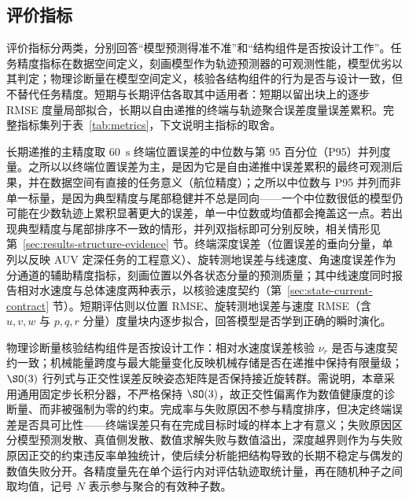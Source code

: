 \subsection{评价指标}
\label{subsec:metrics}

评价指标分两类，分别回答“模型预测得准不准”和“结构组件是否按设计工作”。任务精度指标在数据空间定义，刻画模型作为轨迹预测器的可观测性能，模型优劣以其判定；物理诊断量在模型空间定义，核验各结构组件的行为是否与设计一致，但不替代任务精度。短期与长期评估各取其中适用者：短期以留出块上的逐步 RMSE 度量局部拟合，长期以自由递推的终端与轨迹聚合误差度量误差累积。完整指标集列于表~\ref{tab:metrics}，下文说明主指标的取舍。

长期递推的主精度取 60~\(\mathrm{s}\) 终端位置误差的中位数与第 95 百分位（P95）并列度量。之所以以终端位置误差为主，是因为它是自由递推中误差累积的最终可观测后果，并在数据空间有直接的任务意义（航位精度）；之所以中位数与 P95 并列而非单一标量，是因为典型精度与尾部稳健并不总是同向——一个中位数很低的模型仍可能在少数轨迹上累积显著更大的误差，单一中位数或均值都会掩盖这一点。若出现典型精度与尾部排序不一致的情形，并列双指标即可分别反映，相关情形见第~\ref{sec:results-structure-evidence} 节。终端深度误差（位置误差的垂向分量，单列以反映 AUV 定深任务的工程意义）、旋转测地误差与线速度、角速度误差作为分通道的辅助精度指标，刻画位置以外各状态分量的预测质量；其中线速度同时报告相对水速度与总体速度两种表示，以核验速度契约（第~\ref{sec:state-current-contract} 节）。短期评估则以位置 RMSE、旋转测地误差与速度 RMSE（含 \(u,v,w\) 与 \(p,q,r\) 分量）度量块内逐步拟合，回答模型是否学到正确的瞬时演化。

物理诊断量核验结构组件是否按设计工作：相对水速度误差核验 \(\nu_r\) 是否与速度契约一致；机械能量跨度与最大能量变化反映机械存储是否在递推中保持有限量级；\(\SO(3)\) 行列式与正交性误差反映姿态矩阵是否保持接近旋转群。需说明，本章采用通用固定步长积分器，不严格保持 \(\SO(3)\)，故正交性偏离作为数值健康度的诊断量、而非被强制为零的约束。完成率与失败原因不参与精度排序，但决定终端误差是否具可比性——终端误差只有在完成目标时域的样本上才有意义；失败原因区分模型预测发散、真值侧发散、数值求解失败与数值溢出，深度越界则作为与失败原因正交的约束违反率单独统计，使后续分析能把结构导致的长期不稳定与偶发的数值失败分开。各精度量先在单个运行内对评估轨迹取统计量，再在随机种子之间取均值，记号 \(N\) 表示参与聚合的有效种子数。

